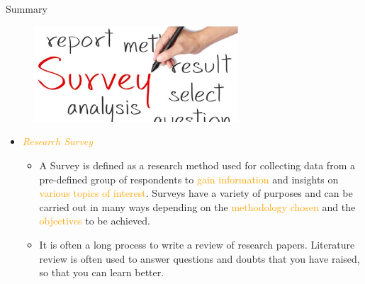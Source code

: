 \documentclass[
 size=14pt,
 paper=smartboard,  %
 mode=present, 		%
 display=slides, 	%
 style=tuliplab,  	%
 pauseslide,
 fleqn,leqno]{powerdot}{}
\begin{document}
\begin{slide}[toc=,bm=]{Summary}

\begin{figure}
  \centering
  \includegraphics[width=3in]{figures/survey.eps}\\
\end{figure}

  \begin{itemize}
    \item \textcolor{orange}{\textit{Research Survey}}
         \begin{itemize}
           \item A Survey is defined as a research method used for collecting data from a pre-defined group of respondents to \textcolor{orange}{gain information} and insights on \textcolor{orange}{various topics of interest}. Surveys have a variety of purposes and can be carried out in many ways depending on the \textcolor{orange}{methodology chosen} and the \textcolor{orange}{objectives} to be achieved.
           \item It is often a long process to write a review of research papers. Literature review is often used to answer questions and doubts that you have raised, so that you can learn better.
         \end{itemize}
  \end{itemize}
\end{slide}
\end{document}
